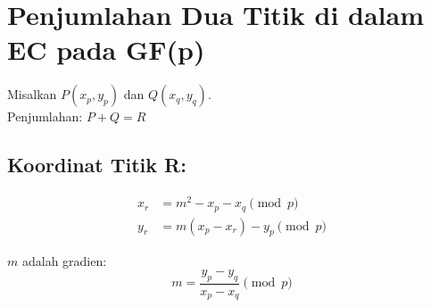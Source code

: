 \documentclass{article}
\begin{document}

\section*{Penjumlahan Dua Titik di dalam EC pada GF(p)}

Misalkan $P(x_p, y_p)$ dan $Q(x_q, y_q)$. \\
Penjumlahan: $P + Q = R$

\subsection*{Koordinat Titik R:}
\[
\begin{aligned}
x_r &= m^2 - x_p - x_q \pmod{p} \\
y_r &= m(x_p - x_r) - y_p \pmod{p}
\end{aligned}
\]

$m$ adalah gradien:
\[
 m = \frac{y_p - y_q}{x_p - x_q} \pmod{p}
\]
\end{document}
